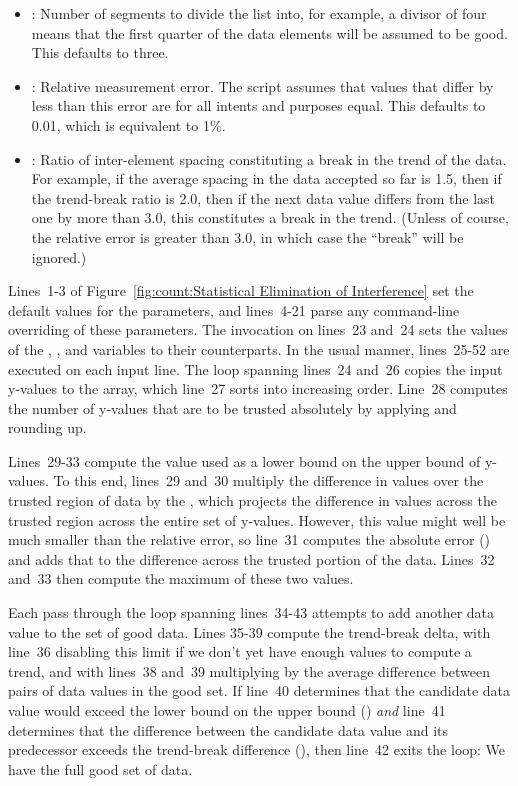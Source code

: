 \begin{itemize}
\item	{}: Number of segments to divide the list into,
	for example, a divisor of four means that the first quarter
	of the data elements will be assumed to be good.
	This defaults to three.
\item	{}: Relative measurement error.  The script assumes
	that values that differ by less than this error are for all
	intents and purposes equal.
	This defaults to 0.01, which is equivalent to 1\%.
\item	{}: Ratio of inter-element spacing constituting
	a break in the trend of the data.
	For example, if the average spacing in the data accepted so far
	is 1.5, then if the trend-break ratio is 2.0, then if the next
	data value differs from the last one by more than 3.0, this
	constitutes a break in the trend.
	(Unless of course, the relative error is greater than 3.0, in
	which case the ``break'' will be ignored.)
\end{itemize}

Lines~1-3 of
Figure~\ref{fig:count:Statistical Elimination of Interference}
set the default values for the parameters, and lines~4-21 parse
any command-line overriding of these parameters.
The  invocation on lines~23 and~24 sets the values of the
, , and  variables to their
 counterparts.
In the usual  manner, lines~25-52 are executed on each input
line.
The loop spanning lines~24 and~26 copies the input y-values to the
 array, which line~27 sorts into increasing order.
Line~28 computes the number of y-values that are to be trusted absolutely
by applying  and rounding up.

Lines~29-33 compute the  value used as a lower bound on
the upper bound of y-values.
To this end, lines~29 and~30 multiply the difference in values over
the trusted region of data by the , which projects the
difference in values across the trusted region across the entire
set of y-values.
However, this value might well be much smaller than the relative error,
so line~31 computes the absolute error () and adds
that to the difference  across the trusted portion of the data.
Lines~32 and~33 then compute the maximum of these two values.

Each pass through the loop spanning lines~34-43 attempts to add another
data value to the set of good data.
Lines 35-39 compute the trend-break delta, with line~36 disabling this
limit if we don't yet have enough values to compute a trend,
and with lines~38 and~39 multiplying  by the average
difference between pairs of data values in the good set.
If line~40 determines that the candidate data value would exceed the
lower bound on the upper bound () \emph{and}
line~41 determines that the difference between the candidate data value
and its predecessor exceeds the trend-break difference (),
then line~42 exits the loop: We have the full good set of data.

